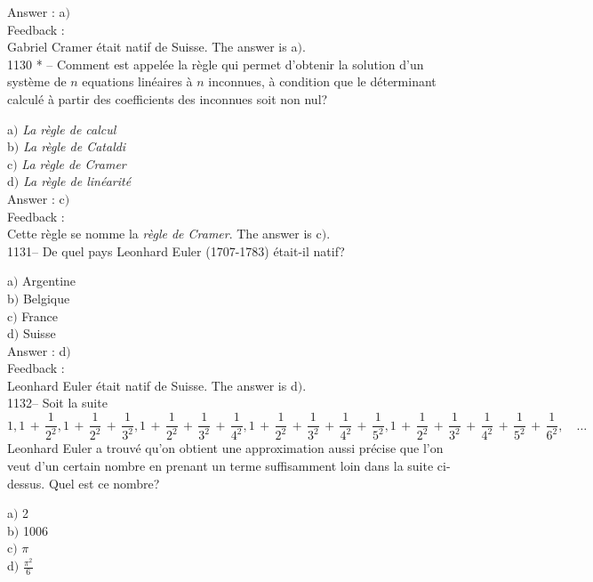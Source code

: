 \documentclass[letterpaper, 12pt]{article}
\begin{document}
Answer : a$)$\\

Feedback : \\
Gabriel Cramer \'etait natif de Suisse.
The answer is a$)$.\\

1130 * -- Comment est appel\'ee la r\`egle qui permet d'obtenir la
solution d'un syst\`eme de $n$ equations lin\'eaires \`a $n$
inconnues, \`a condition que le d\'eterminant calcul\'e \`a partir
des coefficients des inconnues soit non nul?

a$)$ {\sl La r\`egle de calcul} \\
b$)$ {\sl La r\`egle de Cataldi} \\
c$)$ {\sl La r\`egle de Cramer} \\
d$)$ {\sl La r\`egle de lin\'earit\'e}   \\

Answer : c$)$\\

Feedback : \\
Cette r\`egle se nomme la {\sl r\`egle de Cramer}.
The answer is c$)$.\\

1131-- De quel pays Leonhard Euler (1707-1783) \'etait-il natif?

a$)$ Argentine\\
b$)$ Belgique \\
c$)$ France  \\
d$)$ Suisse  \\


Answer : d$)$\\

Feedback : \\
Leonhard Euler \'etait natif de Suisse. The answer is d$)$. \\

1132-- Soit la suite
$$\displaystyle{1,1\,+\,\frac1{2^2},1\,+\,\frac1{2^2}\,+\,\frac1{3^2},1\,+\,\frac1{2^2}\,+\,\frac1{3^2}\,+\,\frac1{4^2},
1\,+\,\frac1{2^2}\,+\,\frac1{3^2}\,+\,\frac1{4^2}\,+\,\frac1{5^2},
1\,+\,\frac1{2^2}\,+\,\frac1{3^2}\,+\,\frac1{4^2}\,+\,\frac1{5^2}\,+\,\frac1{6^2}},\quad\ldots$$
Leonhard Euler a trouv\'e qu'on obtient une approximation aussi
pr\'ecise que l'on veut d'un certain nombre en prenant un terme
suffisamment loin dans la suite ci-dessus. Quel est ce nombre?

a$)$ 2\\
b$)$ 1006 \\
c$)$ $\pi$ \\
d$)$ $\frac{\pi^2}6$\\
\end{document}
